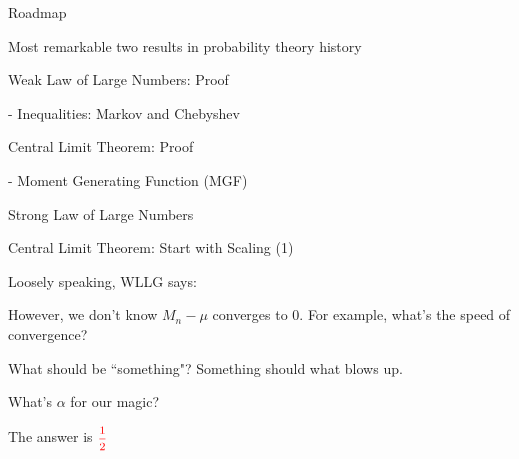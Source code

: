 \begin{frame}{Roadmap}

\plitemsep 0.1in

\bci 
\item Most remarkable two results in probability theory history

\bigskip

\item {}
\item {}
\item Weak Law of Large Numbers: Proof

- Inequalities: Markov and Chebyshev

\item Central Limit Theorem: Proof

- Moment Generating Function (MGF)

\item Strong Law of Large Numbers
\eci 

\end{frame}


\begin{frame}{Central Limit Theorem: Start with Scaling (1)}

\plitemsep 0.1in
 \bci 
 \item<1-> Loosely speaking, WLLG says:

\item<2-> However, we don't know  $M_n -\mu$ converges to 0. For example, what's the speed of convergence? 

\item<3->  What should be ``something"? Something should what blows up. 
\item<5-> What's $\alpha$ for our magic? 

\item<6-> The answer is $\redf{\mfrac{1}{2}}$

\eci 
\end{frame}

